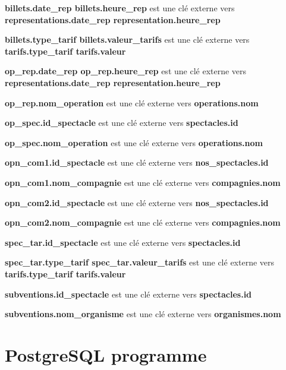 \documentclass[10pt]{report}
\begin{document}
\textbf{billets.date\_rep billets.heure\_rep} est une clé externe vers \textbf{representations.date\_rep representation.heure\_rep}

\textbf{billets.type\_tarif billets.valeur\_tarifs} est une clé externe vers \textbf{tarifs.type\_tarif tarifs.valeur}

\textbf{op\_rep.date\_rep op\_rep.heure\_rep} est une clé externe vers  \textbf{representations.date\_rep representation.heure\_rep}

\textbf{op\_rep.nom\_operation} est une clé externe vers  \textbf{operations.nom}

\textbf{op\_spec.id\_spectacle} est une clé externe vers \textbf{spectacles.id}

\textbf{op\_spec.nom\_operation} est une clé externe vers  \textbf{operations.nom}

\textbf{opn\_com1.id\_spectacle} est une clé externe vers \textbf{nos\_spectacles.id}

\textbf{opn\_com1.nom\_compagnie} est une clé externe vers \textbf{compagnies.nom}

\textbf{opn\_com2.id\_spectacle} est une clé externe vers \textbf{nos\_spectacles.id}

\textbf{opn\_com2.nom\_compagnie} est une clé externe vers \textbf{compagnies.nom}

\textbf{spec\_tar.id\_spectacle} est une clé externe vers \textbf{spectacles.id}

\textbf{spec\_tar.type\_tarif spec\_tar.valeur\_tarifs} est une clé externe vers \textbf{tarifs.type\_tarif tarifs.valeur}

\textbf{subventions.id\_spectacle} est une clé externe vers \textbf{spectacles.id}

\textbf{subventions.nom\_organisme} est une clé externe vers \textbf{organismes.nom}

\chapter{PostgreSQL programme}
\end{document}
